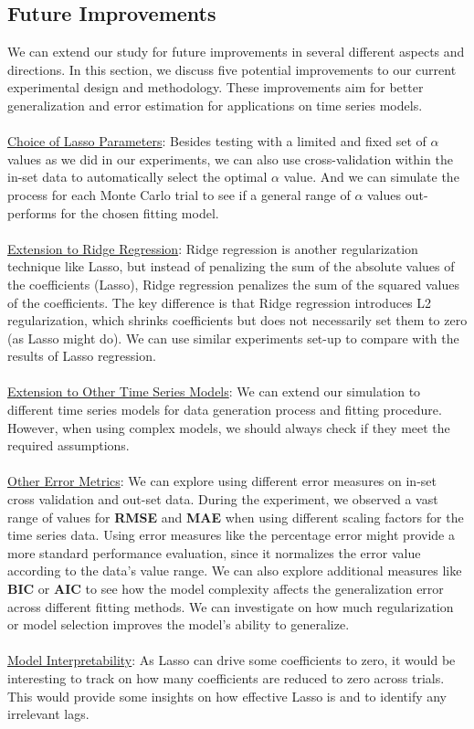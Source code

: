 \documentclass[12pt, oneside]{amsart}
\theoremstyle{definition}
\theoremstyle{remark}
\numberwithin{equation}{section}
\begin{document}
\subsection{Future Improvements}
We can extend our study for future improvements in several different aspects and directions. In this section, we discuss five potential improvements to our current experimental design and methodology. These improvements aim for better generalization and error estimation for applications on time series models. 
\\
\\
\underline{Choice of Lasso Parameters}:
Besides testing with a limited and fixed set of $\alpha$ values as we did in our experiments, we can also use cross-validation within the in-set data to automatically select the optimal $\alpha$ value. And we can simulate the process for each Monte Carlo trial to see if a general range of $\alpha$ values out-performs for the chosen fitting model. 
\\
\\
\underline{Extension to Ridge Regression}: Ridge regression is another regularization technique like Lasso, but instead of penalizing the sum of the absolute values of the coefficients (Lasso), Ridge regression penalizes the sum of the squared values of the coefficients. The key difference is that Ridge regression introduces L2 regularization, which shrinks coefficients but does not necessarily set them to zero (as Lasso might do). We can use similar experiments set-up to compare with the results of Lasso regression.
\\
\\
\underline{Extension to Other Time Series Models}: We can extend our simulation to different time series models for data generation process and fitting procedure. However, when using complex models, we should always check if they meet the required assumptions. 
\\
\\
\underline{Other Error Metrics}:
We can explore using different error measures on in-set cross validation and out-set data. During the experiment, we observed a vast range of values for \textbf{RMSE} and \textbf{MAE} when using different scaling factors for the time series data. Using error measures like the percentage error might provide a more standard performance evaluation, since it normalizes the error value according to the data's value range. We can also explore additional measures like \textbf{BIC} or \textbf{AIC} to see how the model complexity affects the generalization error across different fitting methods. We can investigate on how much regularization or model selection improves the model’s ability to generalize.
\\
\\
\underline{Model Interpretability}:
As Lasso can drive some coefficients to zero, it would be interesting to track on how many coefficients are reduced to zero across trials. This would provide some insights on how effective Lasso is and to identify any irrelevant lags. 
\clearpage
\printbibliography
\end{document}
